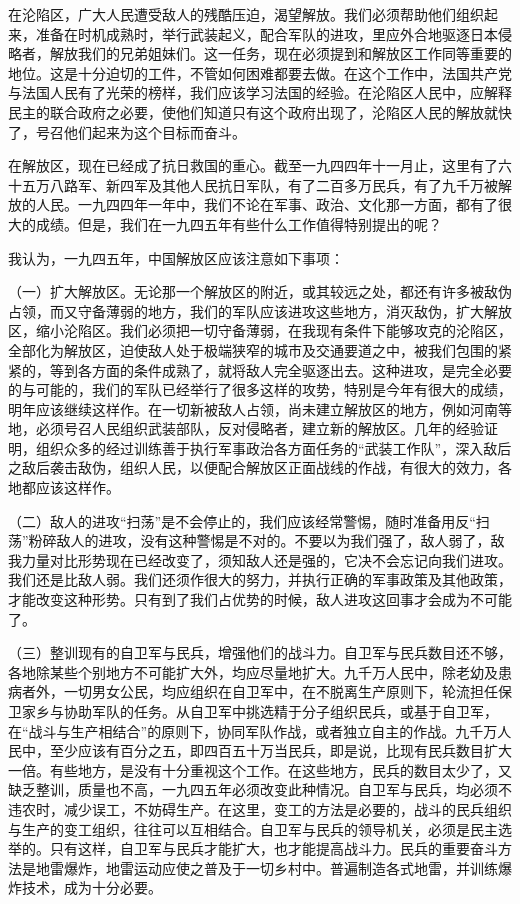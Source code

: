 在沦陷区，广大人民遭受敌人的残酷压迫，渴望解放。我们必须帮助他们组织起来，准备在时机成熟时，举行武装起义，配合军队的进攻，里应外合地驱逐日本侵略者，解放我们的兄弟姐妹们。这一任务，现在必须提到和解放区工作同等重要的地位。这是十分迫切的工件，不管如何困难都要去做。在这个工作中，法国共产党与法国人民有了光荣的榜样，我们应该学习法国的经验。在沦陷区人民中，应解释民主的联合政府之必要，使他们知道只有这个政府出现了，沦陷区人民的解放就快了，号召他们起来为这个目标而奋斗。

在解放区，现在已经成了抗日救国的重心。截至一九四四年十一月止，这里有了六十五万八路军、新四军及其他人民抗日军队，有了二百多万民兵，有了九千万被解放的人民。一九四四年一年中，我们不论在军事、政治、文化那一方面，都有了很大的成绩。但是，我们在一九四五年有些什么工作值得特别提出的呢？

我认为，一九四五年，中国解放区应该注意如下事项：

（一）扩大解放区。无论那一个解放区的附近，或其较远之处，都还有许多被敌伪占领，而又守备薄弱的地方，我们的军队应该进攻这些地方，消灭敌伪，扩大解放区，缩小沦陷区。我们必须把一切守备薄弱，在我现有条件下能够攻克的沦陷区，全部化为解放区，迫使敌人处于极端狭窄的城市及交通要道之中，被我们包围的紧紧的，等到各方面的条件成熟了，就将敌人完全驱逐出去。这种进攻，是完全必要的与可能的，我们的军队已经举行了很多这样的攻势，特别是今年有很大的成绩，明年应该继续这样作。在一切新被敌人占领，尚未建立解放区的地方，例如河南等地，必须号召人民组织武装部队，反对侵略者，建立新的解放区。几年的经验证明，组织众多的经过训练善于执行军事政治各方面任务的“武装工作队”，深入敌后之敌后袭击敌伪，组织人民，以便配合解放区正面战线的作战，有很大的效力，各地都应该这样作。

（二）敌人的进攻“扫荡”是不会停止的，我们应该经常警惕，随时准备用反“扫荡”粉碎敌人的进攻，没有这种警惕是不对的。不要以为我们强了，敌人弱了，敌我力量对比形势现在已经改变了，须知敌人还是强的，它决不会忘记向我们进攻。我们还是比敌人弱。我们还须作很大的努力，并执行正确的军事政策及其他政策，才能改变这种形势。只有到了我们占优势的时候，敌人进攻这回事才会成为不可能了。


（三）整训现有的自卫军与民兵，增强他们的战斗力。自卫军与民兵数目还不够，各地除某些个别地方不可能扩大外，均应尽量地扩大。九千万人民中，除老幼及患病者外，一切男女公民，均应组织在自卫军中，在不脱离生产原则下，轮流担任保卫家乡与协助军队的任务。从自卫军中挑选精于分子组织民兵，或基于自卫军，在“战斗与生产相结合”的原则下，协同军队作战，或者独立自主的作战。九千万人民中，至少应该有百分之五，即四百五十万当民兵，即是说，比现有民兵数目扩大一倍。有些地方，是没有十分重视这个工作。在这些地方，民兵的数目太少了，又缺乏整训，质量也不高，一九四五年必须改变此种情况。自卫军与民兵，均必须不违农时，减少误工，不妨碍生产。在这里，变工的方法是必要的，战斗的民兵组织与生产的变工组织，往往可以互相结合。自卫军与民兵的领导机关，必须是民主选举的。只有这样，自卫军与民兵才能扩大，也才能提高战斗力。民兵的重要奋斗方法是地雷爆炸，地雷运动应使之普及于一切乡村中。普遍制造各式地雷，并训练爆炸技术，成为十分必要。

